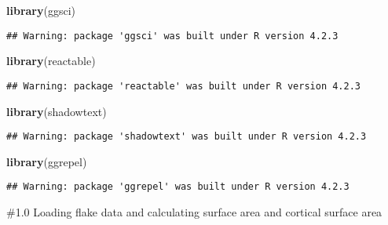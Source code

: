 \documentclass[
]{article}
\newenvironment{Shaded}{\begin{snugshade}}{\end{snugshade}}
\newcommand{\FunctionTok}[1]{\textcolor[rgb]{0.13,0.29,0.53}{\textbf{#1}}}
\newcommand{\NormalTok}[1]{#1}
\begin{document}
\begin{Shaded}
\begin{Highlighting}[]
\FunctionTok{library}\NormalTok{(ggsci)}
\end{Highlighting}
\end{Shaded}

\begin{verbatim}
## Warning: package 'ggsci' was built under R version 4.2.3
\end{verbatim}

\begin{Shaded}
\begin{Highlighting}[]
\FunctionTok{library}\NormalTok{(reactable)}
\end{Highlighting}
\end{Shaded}

\begin{verbatim}
## Warning: package 'reactable' was built under R version 4.2.3
\end{verbatim}

\begin{Shaded}
\begin{Highlighting}[]
\FunctionTok{library}\NormalTok{(shadowtext)}
\end{Highlighting}
\end{Shaded}

\begin{verbatim}
## Warning: package 'shadowtext' was built under R version 4.2.3
\end{verbatim}

\begin{Shaded}
\begin{Highlighting}[]
\FunctionTok{library}\NormalTok{(ggrepel)}
\end{Highlighting}
\end{Shaded}

\begin{verbatim}
## Warning: package 'ggrepel' was built under R version 4.2.3
\end{verbatim}

\#1.0 Loading flake data and calculating surface area and cortical
surface area
\end{document}
